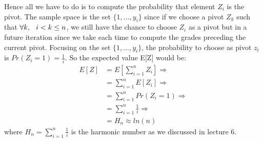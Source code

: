 \documentclass[11pt]{537homework}
\begin{document}
Hence all we have to do is to compute the probability that element $Z_i$ is the pivot. The sample space is the set $\{ 1,...,y_i \}$ since if we choose a pivot $Z_k$ such that $\forall k, \hspace{0.25cm} i < k \leq n$, we still have the chance to choose $Z_i$ as a pivot but in a future iteration since we take each time to compute the grades preceding the current pivot. Focusing on the set $\{ 1,...,y_i \}$, the probability to choose as pivot $z_i$ is $Pr(Z_i = 1) = \frac{1}{i}$. So the expected value E[Z] would be: 
\begingroup
\allowdisplaybreaks
\begin{align*}
 E[Z] &= E[\sum_{i=1}^{n} Z_i] \Longrightarrow \\
      &= \sum_{i=1}^{n} E[Z_i] \Longrightarrow \\
      &= \sum_{i=1}^{n} Pr(Z_i = 1) \Longrightarrow \\
      &= \sum_{i=1}^{n} \frac{1}{i} \Longrightarrow \\
      &= H_n \approx ln(n)    
\end{align*}
\endgroup
where $H_n = \sum_{i=1}^{n} \frac{1}{i}$ is the harmonic number as we discussed in lecture 6.
\end{document}
